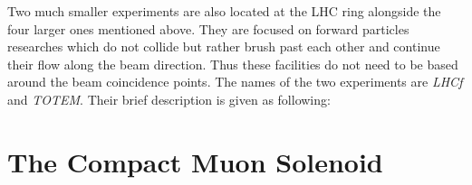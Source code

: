 Two much smaller experiments are also located at the LHC ring alongside the four larger ones mentioned above. They are focused on forward particles
researches which do not collide but rather brush past each other and continue their flow along the beam direction. Thus these facilities do not
need to be based around the beam coincidence points. The names of the two experiments are \textit{LHCf} and \textit{TOTEM}.
Their brief description is given as following:


 \section{The Compact Muon Solenoid}\label{sec:CMS}
% 
